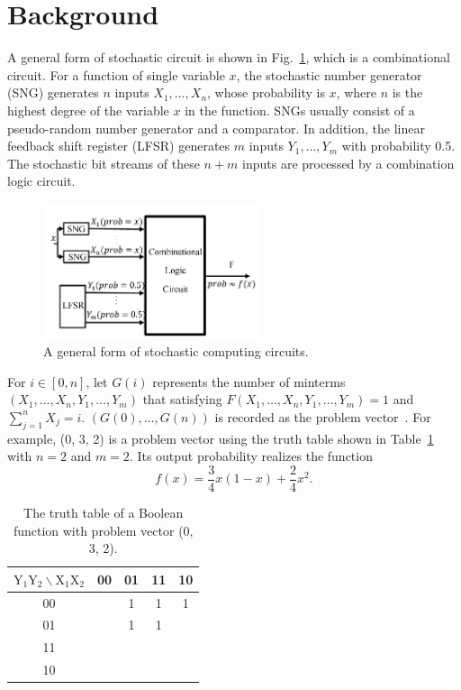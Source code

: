 \documentclass[conference,letterpaper]{IEEEtran}
\begin{document}
\section*{Background}
A general form of stochastic circuit is shown in Fig.~\ref{fig2}, which is a combinational circuit. For a function of single variable $x$, the stochastic number generator (SNG) generates $n$ inputs $X_{1}, \ldots, X_{n}$, whose probability is $x$, where $n$ is the highest degree of the variable $x$ in the function. SNGs usually consist of a pseudo-random number generator and a comparator. In addition, the linear feedback shift register (LFSR) generates $m$ inputs $Y_{1}, \ldots, Y_{m}$ with probability 0.5. The stochastic bit streams of these $n+m$ inputs are processed by a combination logic circuit.

\begin{figure}[t]
	\centering
	\includegraphics[width=2.5in]{fig/sc.pdf}	
	\caption{\label{fig2}A general form of stochastic computing circuits.} \vspace{-3ex}
\end{figure}

For $i\in[0,n]$, let $G(i)$ represents the number of minterms $(X_{1}, \ldots, X_{n}, Y_{1}, \ldots, Y_{m})$ that satisfying $F(X_{1}, \ldots, X_{n}, Y_{1}, \ldots, Y_{m})=1$ and $\sum_{j=1}^{n} X_{j}=i$. $(G(0), \ldots, G(n))$ is recorded as the problem vector~\cite{2}. For example, (0, 3, 2) is a problem vector using the truth table shown in Table~\ref{tab:tt} with $n=2$ and $m=2$. Its output probability realizes the function
\begin{equation}
f(x)=\frac{3}{4} x(1-x)+\frac{2}{4} x^{2}.
\end{equation}


\begin{table}[b]
\setlength{\abovecaptionskip}{0.cm}
\setlength{\belowcaptionskip}{0.pt}
\setlength{\tabcolsep}{1mm}
\caption{The truth table of a Boolean function with problem vector (0, 3, 2).}
\centering \label{tab:tt}
\begin{tabular}{|c|c|c|c|c|}
\hline $\mathrm{Y}_{1} \mathrm{Y}_{2} \backslash \mathrm{X}_{1} \mathrm{X}_{2}$ & 00 & 01 & 11 & 10 \\
\hline 00 & & 1 & 1 & 1 \\
\hline 01 & & 1 & 1 & \\
\hline 11 & & & & \\
\hline 10 & & & & \\
\hline
\end{tabular}\vspace{-5ex}
\end{table}
\end{document}
